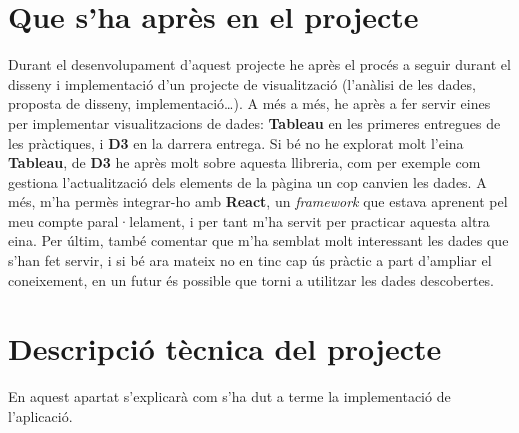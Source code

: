 \documentclass{article}
\begin{document}
\section{Que s'ha après en el projecte}
Durant el desenvolupament d'aquest projecte he après el procés a seguir durant
el disseny i implementació d'un projecte de visualització (l'anàlisi de les
dades, proposta de disseny, implementació\dots). A més a més, he après a fer
servir eines per implementar visualitzacions de dades: \textbf{Tableau} en les
primeres entregues de les pràctiques, i \textbf{D3} en la darrera entrega. Si
bé no he explorat molt l'eina \textbf{Tableau}, de \textbf{D3} he après molt
sobre aquesta llibreria, com per exemple com gestiona l'actualització dels
elements de la pàgina un cop canvien les dades. A més, m'ha permès integrar-ho
amb \textbf{React}, un \textit{framework} que estava aprenent pel meu compte
paral·lelament, i per tant m'ha servit per practicar aquesta altra eina. Per
últim, també comentar que m'ha semblat molt interessant les dades que s'han
fet servir, i si bé ara mateix no en tinc cap ús pràctic a part d'ampliar el
coneixement, en un futur és possible que torni a utilitzar les dades descobertes.

\section{Descripció tècnica del projecte}
En aquest apartat s'explicarà com s'ha dut a terme la implementació de l'aplicació.
\end{document}
